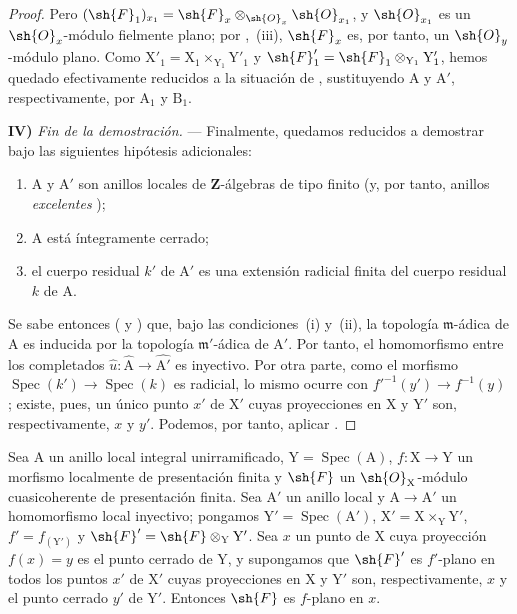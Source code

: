 \begin{proof}
Pero $(\sh{F}_1)_{x_1}=\sh{F}_x\otimes_{\sh{O}_x}\sh{O}_{x_1}$, y $\sh{O}_{x_1}$ es un $\sh{O}_x$-módulo fielmente plano; por ,~(iii), $\sh{F}_x$ es, por tanto, un $\sh{O}_y$-módulo plano.
Como $\mathrm{X}'_1=\mathrm{X}_1\times_{\mathrm{Y}_1}\mathrm{Y}'_1$ y $\sh{F}'_1=\sh{F}_1\otimes_{\mathrm{Y}_1}\mathrm{Y}'_1$, hemos quedado efectivamente reducidos a la situación de , sustituyendo $\mathrm{A}$ y $\mathrm{A}'$, respectivamente, por $\mathrm{A}_1$ y $\mathrm{B}_1$.

\medskip
\noindent\textbf{IV)} \emph{Fin de la demostración.} --- Finalmente, quedamos reducidos a demostrar  bajo las siguientes hipótesis adicionales:
\begin{enumerate}[label=(\roman*)]
  \item $\mathrm{A}$ y $\mathrm{A}'$ son anillos locales de $\mathbf{Z}$-álgebras de tipo finito (y, por tanto, anillos \emph{excelentes} );
  \item $\mathrm{A}$ está íntegramente cerrado;
  \item el cuerpo residual $k'$ de $\mathrm{A}'$ es una extensión radicial finita del cuerpo residual $k$ de $\mathrm{A}$.
\end{enumerate}
Se sabe entonces ( y ) que, bajo las condiciones~(i) y~(ii), la topología $\mathfrak{m}$-ádica de $\mathrm{A}$ es inducida por la topología $\mathfrak{m}'$-ádica de $\mathrm{A}'$.
Por tanto, el homomorfismo entre los completados $\widehat{u}:\widehat{\mathrm{A}}\to\widehat{\mathrm{A}'}$ es inyectivo.
Por otra parte, como el morfismo $\operatorname{Spec}(k')\to\operatorname{Spec}(k)$ es radicial, lo mismo ocurre con $f'^{-1}(y')\to f^{-1}(y)$ ; existe, pues, un único punto $x'$ de $\mathrm{X}'$ cuyas proyecciones en $\mathrm{X}$ y $\mathrm{Y}'$ son, respectivamente, $x$ y $y'$.
Podemos, por tanto, aplicar .
\end{proof}

\begin{corollary}[11.6.2]
\label{IV.11.6.2}
Sea $\mathrm{A}$ un anillo local integral unirramificado, $\mathrm{Y}=\operatorname{Spec}(\mathrm{A})$, $f:\mathrm{X}\to\mathrm{Y}$ un morfismo localmente de presentación finita y $\sh{F}$ un $\sh{O}_\mathrm{X}$-módulo cuasicoherente de presentación finita.
Sea $\mathrm{A}'$ un anillo local y $\mathrm{A}\to\mathrm{A}'$ un homomorfismo local inyectivo; pongamos $\mathrm{Y}'=\operatorname{Spec}(\mathrm{A}')$, $\mathrm{X}'=\mathrm{X}\times_\mathrm{Y}\mathrm{Y}'$, $f'=f_{(\mathrm{Y}')}$ y $\sh{F}'=\sh{F}\otimes_\mathrm{Y}\mathrm{Y}'$.
Sea $x$ un punto de $\mathrm{X}$ cuya proyección $f(x)=y$ es el punto cerrado de $\mathrm{Y}$, y supongamos que $\sh{F}'$ es $f'$-plano en todos los puntos $x'$ de $\mathrm{X}'$ cuyas proyecciones en $\mathrm{X}$ y $\mathrm{Y}'$ son, respectivamente, $x$ y el punto cerrado $y'$ de $\mathrm{Y}'$.
Entonces $\sh{F}$ es $f$-plano en $x$.
\end{corollary}

